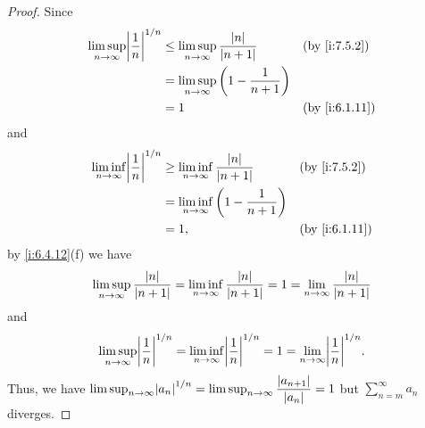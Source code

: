 \begin{proof}
  Since
  \begin{align*}
    \limsup_{n \to \infty} \abs{\dfrac{1}{n}}^{1 / n} & \leq \limsup_{n \to \infty} \dfrac{\abs{n}}{\abs{n + 1}}  &  & \by{i:7.5.2}  \\
                                                      & = \limsup_{n \to \infty} \bigg(1 - \dfrac{1}{n + 1}\bigg)                    \\
                                                      & = 1                                                       &  & \by{i:6.1.11}
  \end{align*}
  and
  \begin{align*}
    \liminf_{n \to \infty} \abs{\dfrac{1}{n}}^{1 / n} & \geq \liminf_{n \to \infty} \dfrac{\abs{n}}{\abs{n + 1}}  &  & \by{i:7.5.2}  \\
                                                      & = \liminf_{n \to \infty} \bigg(1 - \dfrac{1}{n + 1}\bigg)                    \\
                                                      & = 1,                                                      &  & \by{i:6.1.11}
  \end{align*}
  by \cref{i:6.4.12}(f) we have
  \[
    \limsup_{n \to \infty} \dfrac{\left\lvert n\right\rvert}{\left\lvert n + 1\right\rvert} = \liminf_{n \to \infty} \dfrac{\left\lvert n\right\rvert}{\left\lvert n + 1\right\rvert} = 1 = \lim_{n \to \infty} \dfrac{\left\lvert n\right\rvert}{\left\lvert n + 1\right\rvert}
  \]
  and
  \[
    \limsup_{n \to \infty} \abs{\dfrac{1}{n}}^{1 / n} = \liminf_{n \to \infty} \abs{\dfrac{1}{n}}^{1 / n} = 1 = \lim_{n \to \infty} \abs{\dfrac{1}{n}}^{1 / n}.
  \]
  Thus, we have \(\limsup_{n \to \infty} \abs{a_n}^{1 / n} = \limsup_{n \to \infty} \dfrac{\abs{a_{n + 1}}}{\abs{a_n}} = 1\) but \(\sum_{n = m}^\infty a_n\) diverges.


\end{proof}
